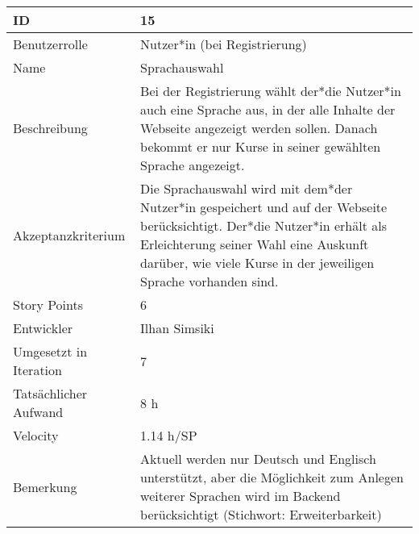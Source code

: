 \begin{tabularx}{\textwidth}{|p{}|X|}
	\hline
	ID & 15\\
	\hline
	Benutzerrolle & Nutzer*in (bei Registrierung)\\
	\hline
	Name & Sprachauswahl\\
	\hline
	Beschreibung & Bei der Registrierung wählt der*die Nutzer*in auch eine Sprache aus, in der alle Inhalte der Webseite angezeigt werden sollen. Danach bekommt er nur Kurse in seiner gewählten Sprache angezeigt.\\
	\hline
	Akzeptanzkriterium & Die Sprachauswahl wird mit dem*der Nutzer*in gespeichert und auf der Webseite berücksichtigt. Der*die Nutzer*in erhält als Erleichterung seiner Wahl eine Auskunft darüber, wie viele Kurse in der jeweiligen Sprache vorhanden sind.\\
	\hline
	Story Points & 6\\
	\hline
	Entwickler & Ilhan Simsiki\\
	\hline
	Umgesetzt in Iteration & 7\\
	\hline
	Tatsächlicher Aufwand & 8 h\\
	\hline
	Velocity & 1.14 h/SP\\
	\hline
	Bemerkung & Aktuell werden nur Deutsch und Englisch unterstützt, aber die Möglichkeit zum Anlegen weiterer Sprachen wird im Backend berücksichtigt (Stichwort: Erweiterbarkeit)\\
	\hline
\end{tabularx}
\vspace{20pt}
